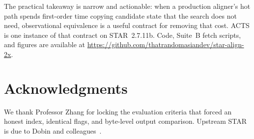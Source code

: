 \documentclass[11pt]{article}
\newcommand{\STAR}{STAR\xspace}
\newcommand{\ACTS}{ACTS\xspace}
\begin{document}
The practical takeaway is narrow and actionable: when a production aligner's
hot path spends first-order time copying candidate state that the search does
not need, observational equivalence is a useful contract for removing that
cost.
\ACTS is one instance of that contract on \STAR~2.7.11b.
Code, Suite~B fetch scripts, and figures are available at
\url{https://github.com/thatrandomasiandev/star-align-2x}.

\section*{Acknowledgments}

We thank Professor Zhang for locking the evaluation criteria that forced an
honest index, identical flags, and byte-level output comparison.
Upstream \STAR is due to Dobin and colleagues~\cite{dobin2013star,dobin2015mapping}.



\end{document}
